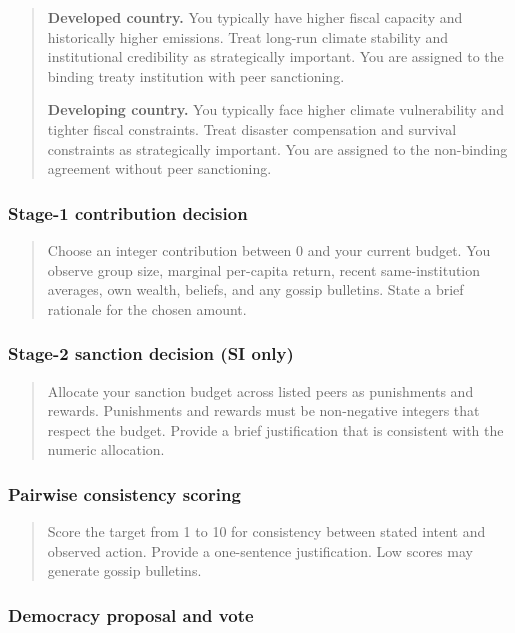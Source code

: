 \begin{quote}
\small
\textbf{Developed country.}
You typically have higher fiscal capacity and historically higher emissions.
Treat long-run climate stability and institutional credibility as strategically important.
You are assigned to the binding treaty institution with peer sanctioning.

\textbf{Developing country.}
You typically face higher climate vulnerability and tighter fiscal constraints.
Treat disaster compensation and survival constraints as strategically important.
You are assigned to the non-binding agreement without peer sanctioning.
\end{quote}

\subsubsection{Stage-1 contribution decision}

\begin{quote}
\small
Choose an integer contribution between 0 and your current budget.
You observe group size, marginal per-capita return, recent same-institution averages, own wealth, beliefs, and any gossip bulletins.
State a brief rationale for the chosen amount.
\end{quote}

\subsubsection{Stage-2 sanction decision (SI only)}

\begin{quote}
\small
Allocate your sanction budget across listed peers as punishments and rewards.
Punishments and rewards must be non-negative integers that respect the budget.
Provide a brief justification that is consistent with the numeric allocation.
\end{quote}

\subsubsection{Pairwise consistency scoring}

\begin{quote}
\small
Score the target from 1 to 10 for consistency between stated intent and observed action.
Provide a one-sentence justification.
Low scores may generate gossip bulletins.
\end{quote}

\subsubsection{Democracy proposal and vote}

